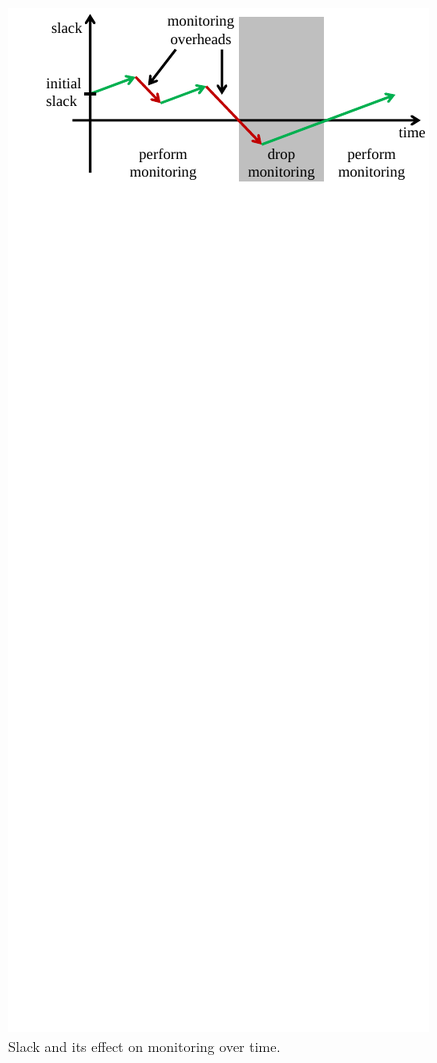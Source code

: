 \begin{figure}
  \begin{center}
    \includegraphics[width=\columnwidth]{figs/slack.pdf}
    \vspace{-0.3in}
    \caption{Slack and its effect on monitoring over time.}
    \label{fig:policies.slack}
    \vspace{-0.1in}
  \end{center}
\end{figure}

